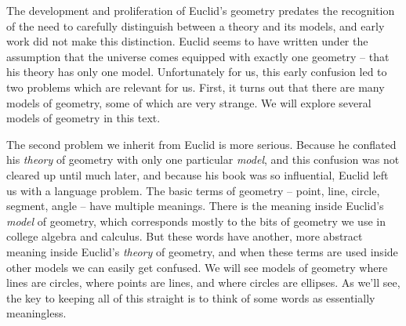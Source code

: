 The development and proliferation of Euclid's geometry predates the recognition of the need to carefully distinguish between a theory and its models, and early work did not make this distinction. Euclid seems to have written under the assumption that the universe comes equipped with exactly one geometry -- that his theory has only one model. Unfortunately for us, this early confusion led to two problems which are relevant for us. First, it turns out that there are many models of geometry, some of which are very strange. We will explore several models of geometry in this text.

The second problem we inherit from Euclid is more serious. Because he conflated his \emph{theory} of geometry with only one particular \emph{model}, and this confusion was not cleared up until much later, and because his book was so influential, Euclid left us with a language problem. The basic terms of geometry -- point, line, circle, segment, angle -- have multiple meanings. There is the meaning inside Euclid's \emph{model} of geometry, which corresponds mostly to the bits of geometry we use in college algebra and calculus. But these words have another, more abstract meaning inside Euclid's \emph{theory} of geometry, and when these terms are used inside other models we can easily get confused. We will see models of geometry where lines are circles, where points are lines, and where circles are ellipses. As we'll see, the key to keeping all of this straight is to think of some words as essentially meaningless.
